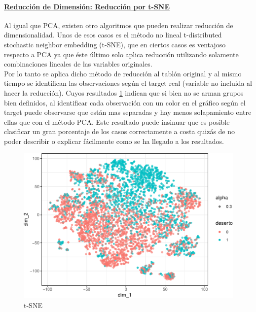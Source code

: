 \paragraph{\textbf{\underline{Reducción de Dimensión: Reducción por t-SNE}}}\label{reducciuxf3n-por-t-sne}

Al igual que PCA, existen otro algoritmos que pueden realizar reducción
de dimensionalidad. Unos de esos casos es el método no lineal
t-distributed stochastic neighbor embedding (t-SNE), que en ciertos
casos es ventajoso respecto a PCA ya que éste último solo aplica reducción utilizando solamente
combinaciones lineales de las variables originales.\\

Por lo tanto se aplica dicho método de reducción al tablón original y al mismo tiempo se identifican las observaciones según el target real (variable no incluida al hacer la reducción). Cuyos resultados \ref{fig:tsne} indican que si bien no se arman grupos bien definidos,
al identificar cada observación con un color en el gráfico según el
target puede observarse que están mas separadas y hay menos solapamiento entre ellas que con el método PCA. Este resultado puede insinuar que es posible clasificar un gran porcentaje de los casos correctamente a costa quizás de no poder describir o explicar fácilmente como se ha llegado a los resultados.


\begin{figure}[!htb]
	\centering
	\includegraphics{imagenes/reduccion_dimension/unnamed-chunk-11-1.pdf}
	\caption{t-SNE}
	\label{fig:tsne}
\end{figure}

\clearpage




